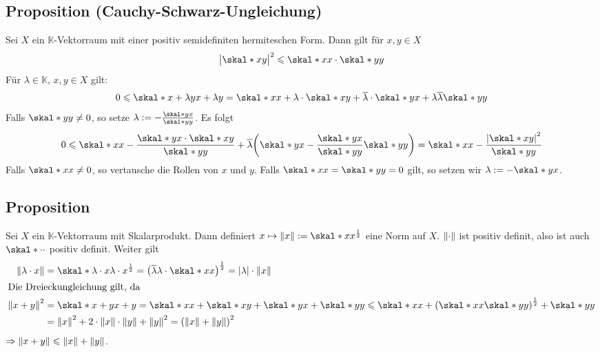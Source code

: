 \subsection{Proposition (Cauchy-Schwarz-Ungleichung)} %
\label{sub:74}
Sei $X$ ein $\mathds{K}$-Vektorraum mit einer positiv semidefiniten hermiteschen Form. Dann gilt für $x,y \in X$ 
\[
	\abs[\big]{\skal*{x}{y}}^2 \le \skal*{x}{x} \cdot \skal*{y}{y}
\]
Für $\lambda \in \mathds{K}$, $x,y \in X$ gilt: 
\begin{align*}
0 \le \skal*{x+\lambda y}{x + \lambda y} = \skal*{x}{x} + \lambda \cdot \skal*{x}{y} + \overline{\lambda} \cdot \skal*{y}{x} + \lambda \overline{\lambda} \skal*{y}{y}  
\end{align*}
Falls $\skal*{y}{y} \not=0$, so setze $\lambda := - \frac{\skal*{y}{x}}{\skal*{y}{y}}$. Es folgt 
\begin{align*}
	0 \le \skal*{x}{x} - \frac{\skal*{y}{x} \cdot \skal*{x}{y}}{\skal*{y}{y}} + \overline{\lambda} \enbrace*{\skal*{y}{x}  - \frac{\skal*{y}{x}}{\skal*{y}{y}} \skal*{y}{y}   } = \skal*{x}{x} - \frac{\abs*{\skal*{x}{y}}^2 }{\skal*{y}{y}} 
\end{align*}
Falls $\skal*{x}{x} \not= 0$, so vertausche die Rollen von $x$ und $y$. Falls $\skal*{x}{x}=\skal*{y}{y}=0$ gilt, so setzen wir $\lambda := - \skal*{y}{x}$. \bewende

\subsection[Proposition: Ein Skalarprodukt definiert eine Norm]{Proposition} %
\label{sub:75}
Sei $X$ ein $\mathds{K}$-Vektorraum mit Skalarprodukt. Dann definiert $x \mapsto \norm{x} := \skal*{x}{x}^{\frac{1}{2}}$ eine Norm auf $X$.
$\norm{\cdot }$ ist positiv definit, also ist auch $\skal*{\cdot}{\cdot}$ positiv definit. Weiter gilt
\begin{align*}
	\norm{\lambda \cdot x} &= \skal*{\lambda \cdot x}{\lambda \cdot x}^{\frac{1}{2}} = \enbrace*{\overline{\lambda} \lambda \cdot \skal*{x}{x}}^{\frac{1}{2}} 
	= \abs*{\lambda} \cdot \norm{x}    \\
	\shortintertext{Die Dreieckungleichung gilt, da}
	\norm{x+y}^2 &= \skal*{x+y}{x+y} = \skal*{x}{x} + \skal*{x}{y} + \skal*{y}{x} + \skal*{y}{y} \le \skal*{x}{x} +  \enbrace*{\skal*{x}{x} \skal*{y}{y}}^{\frac{1}{2}}
	+ \skal*{y}{y}  \\
	&= \norm{x}^2 + 2 \cdot \norm{x} \cdot \norm{y} + \norm{y}^2 = \enbrace*{\norm{x} + \norm{y}}^2    
\end{align*}
$\Rightarrow \norm{x+y} \le \norm{x} + \norm{y}$. \bewende

